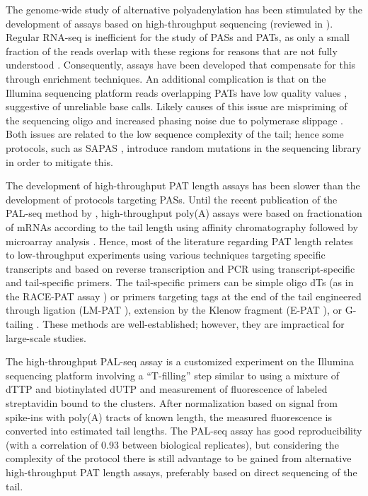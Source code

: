 \documentclass[10pt]{article}
\begin{document}
The genome-wide study of alternative polyadenylation has been stimulated by the development of assays based on high-throughput sequencing (reviewed in \cite{elkon13}). Regular RNA-seq is inefficient for the study of PASs and PATs, as only a small fraction of the reads overlap with these regions for reasons that are not fully understood \cite{fu11,wilkening13}. Consequently, assays have been developed that compensate for this through enrichment techniques. An additional complication is that on the Illumina sequencing platform reads overlapping PATs have low quality values \cite{wilkening13}, suggestive of unreliable base calls. Likely causes of this issue are mispriming of the sequencing oligo and increased phasing noise due to polymerase slippage \cite{wilkening13}. Both issues are related to the low sequence complexity of the tail; hence some protocols, such as SAPAS \cite{fu11}, introduce random mutations in the sequencing library in order to mitigate this.

The development of high-throughput PAT length assays has been slower than the development of protocols targeting PASs. Until the recent publication of the PAL-seq method by \cite{subtelny14}, high-throughput poly(A) assays were based on fractionation of mRNAs according to the tail length using affinity chromatography followed by microarray analysis \cite{beilharz07,meijer07}. Hence, most of the literature regarding PAT length relates to low-throughput experiments using various techniques targeting specific transcripts \cite{salles95} and based on reverse transcription and PCR using transcript-specific and tail-specific primers. The tail-specific primers can be simple oligo dTs (as in the RACE-PAT assay \cite{salles95}) or primers targeting tags at the end of the tail engineered through ligation (LM-PAT \cite{salles95}), extension by the Klenow fragment (E-PAT \cite{janicke12}), or G-tailing \cite{kusov01}. These methods are well-established; however, they are impractical for large-scale studies.

The high-throughput PAL-seq assay \cite{subtelny14} is a customized experiment on the Illumina sequencing platform involving a ``T-filling'' step similar to \cite{wilkening13} using a mixture of dTTP and biotinylated dUTP and measurement of fluorescence of labeled streptavidin bound to the clusters. After normalization based on signal from spike-ins with poly(A) tracts of known length, the measured fluorescence is converted into estimated tail lengths. The PAL-seq assay has good reproducibility (with a correlation of 0.93 between biological replicates), but considering the complexity of the protocol there is still advantage to be gained from alternative high-throughput PAT length assays, preferably based on direct sequencing of the tail.
\end{document}
